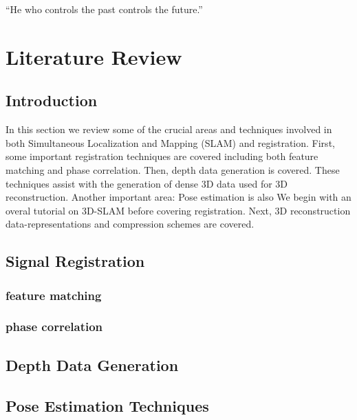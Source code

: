 \begin{savequote}[8cm]
  ``He who controls the past controls the future.''
\end{savequote}
\makeatletter
\chapter{Literature Review}

\section{Introduction}

In this section we review some of the crucial areas and techniques involved in both Simultaneous Localization and Mapping (SLAM) and registration. First, some important registration techniques are covered including both feature matching and phase correlation. Then, depth data generation is covered. These techniques assist with the generation of dense 3D data used for 3D reconstruction. Another important area: Pose estimation is also We begin with an overal tutorial on 3D-SLAM before covering registration. Next, 3D reconstruction data-representations and compression schemes are covered. 


\section{Signal Registration}
\subsection{feature matching}

\subsection{phase correlation}


\section{Depth Data Generation} \label{DepthDataGenSection}

\section{Pose Estimation Techniques}

